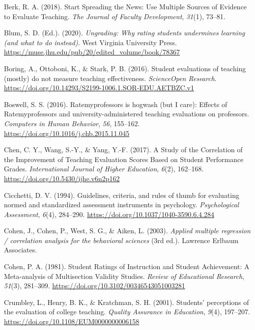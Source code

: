 \documentclass[
  man,mask]{apa7}
\newlength{\cslhangindent}
\newenvironment{CSLReferences}[2] %
 {\begin{list}{}{%
  \setlength{\itemindent}{0pt}
  \setlength{\leftmargin}{0pt}
  \setlength{\parsep}{0pt}
  \ifodd #1
   \setlength{\leftmargin}{\cslhangindent}
   \setlength{\itemindent}{-1\cslhangindent}
  \fi
  \setlength{\itemsep}{#2\baselineskip}}}
 {\end{list}}
\begin{document}
\begin{CSLReferences}{1}{0}
Berk, R. A. (2018). Start Spreading the News: Use Multiple Sources of Evidence to Evaluate Teaching. \emph{The Journal of Faculty Development}, \emph{31}(1), 73--81.

Blum, S. D. (Ed.). (2020). \emph{Ungrading: Why rating students undermines learning (and what to do instead)}. West Virginia University Press. \url{https://muse.jhu.edu/pub/20/edited_volume/book/78367}

Boring, A., Ottoboni, K., \& Stark, P. B. (2016). Student evaluations of teaching (mostly) do not measure teaching effectiveness. \emph{ScienceOpen Research}. \url{https://doi.org/10.14293/S2199-1006.1.SOR-EDU.AETBZC.v1}

Boswell, S. S. (2016). Ratemyprofessors is hogwash (but I care): Effects of Ratemyprofessors and university-administered teaching evaluations on professors. \emph{Computers in Human Behavior}, \emph{56}, 155--162. \url{https://doi.org/10.1016/j.chb.2015.11.045}

Chen, C. Y., Wang, S.-Y., \& Yang, Y.-F. (2017). A Study of the Correlation of the Improvement of Teaching Evaluation Scores Based on Student Performance Grades. \emph{International Journal of Higher Education}, \emph{6}(2), 162--168. \url{https://doi.org/10.5430/ijhe.v6n2p162}

Cicchetti, D. V. (1994). Guidelines, criteria, and rules of thumb for evaluating normed and standardized assessment instruments in psychology. \emph{Psychological Assessment}, \emph{6}(4), 284--290. \url{https://doi.org/10.1037/1040-3590.6.4.284}

Cohen, J., Cohen, P., West, S. G., \& Aiken, L. (2003). \emph{Applied multiple regression / correlation analysis for the behavioral sciences} (3rd ed.). Lawrence Erlbaum Associates.

Cohen, P. A. (1981). Student Ratings of Instruction and Student Achievement: A Meta-analysis of Multisection Validity Studies. \emph{Review of Educational Research}, \emph{51}(3), 281--309. \url{https://doi.org/10.3102/00346543051003281}

Crumbley, L., Henry, B. K., \& Kratchman, S. H. (2001). Students{'} perceptions of the evaluation of college teaching. \emph{Quality Assurance in Education}, \emph{9}(4), 197--207. \url{https://doi.org/10.1108/EUM0000000006158}


\end{CSLReferences}
\end{document}
